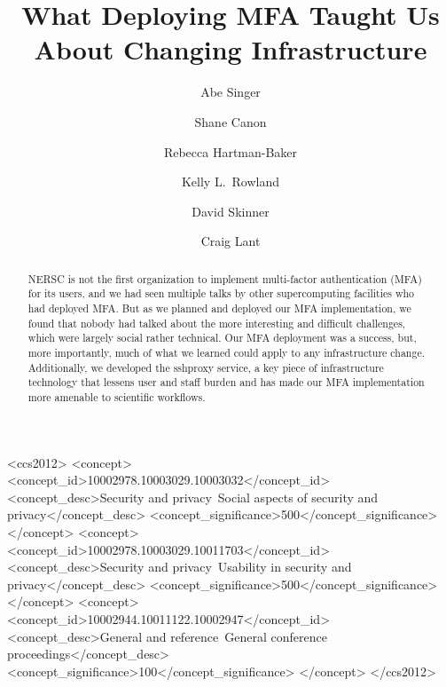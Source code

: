 \documentclass[sigconf,review]{acmart}
\begin{document}
\title{What Deploying MFA Taught Us About Changing Infrastructure}

\author{Abe Singer}

\author{Shane Canon}

\author{Rebecca Hartman-Baker}

\author{Kelly L.\ Rowland}

\author{David Skinner}

\author{Craig Lant}

\begin{abstract}

NERSC is not the first organization to implement multi-factor authentication
(MFA) for its users, and we had seen multiple talks by other supercomputing
facilities who had deployed MFA.  But as we planned and deployed our MFA
implementation, we found that nobody had talked about the more interesting and
difficult challenges, which were largely social rather technical. Our MFA
deployment was a success, but, more importantly, much of what we learned could
apply to any infrastructure change. Additionally, we developed the sshproxy
service, a key piece of infrastructure technology that lessens user and staff
burden and has made our MFA implementation more amenable to scientific
workflows.

\end{abstract}

\begin{CCSXML}
<ccs2012>
<concept>
<concept_id>10002978.10003029.10003032</concept_id>
<concept_desc>Security and privacy~Social aspects of security and privacy</concept_desc>
<concept_significance>500</concept_significance>
</concept>
<concept>
<concept_id>10002978.10003029.10011703</concept_id>
<concept_desc>Security and privacy~Usability in security and privacy</concept_desc>
<concept_significance>500</concept_significance>
</concept>
<concept>
<concept_id>10002944.10011122.10002947</concept_id>
<concept_desc>General and reference~General conference proceedings</concept_desc>
<concept_significance>100</concept_significance>
</concept>
</ccs2012>
\end{CCSXML}
\end{document}

